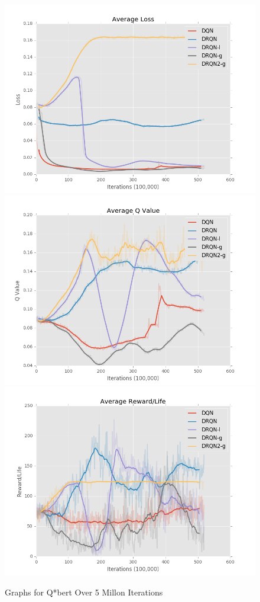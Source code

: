 \documentclass{article}
\begin{document}
\begin{figure}[h]
    \centering
    \begin{minipage}{1.0\textwidth}
        \centering
        \includegraphics[scale=0.2]{avg_loss}
        \centering
        \includegraphics[scale=0.2]{avg_q}
        \centering
        \includegraphics[scale=0.2]{avg_reward}
    \end{minipage}
    \caption{Graphs for Q*bert Over 5 Millon Iterations}
\end{figure}
\end{document}
